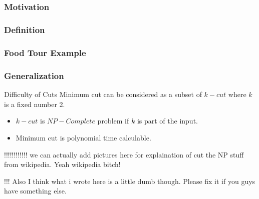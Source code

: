 \subsection{}
\begin{frame}
\frametitle{Motivation}





\end{frame}
\begin{frame}
  \frametitle{Definition}

\end{frame}

\begin{frame}
  \frametitle{Food Tour Example}
\end{frame}


\begin{frame}
  \frametitle{Generalization}
  \begin{block}{Difficulty of Cuts}
    Minimum cut can be considered as a subset of $k-cut$ where $k$ is
    a fixed number 2.
    \begin{itemize}
    \item $k-cut$ is $NP-Complete$ problem if $k$ is part of the
      input.
    \item Minimum cut is polynomial time calculable.
    \end{itemize}
  \end{block}

!!!!!!!!!!!! we can actually add pictures here for explaination of cut
the NP stuff from wikipedia. Yeah wikipedia bitch!

!!! Also I think what i wrote here is a little dumb though. Please fix
it if you guys have something else.
\end{frame}

